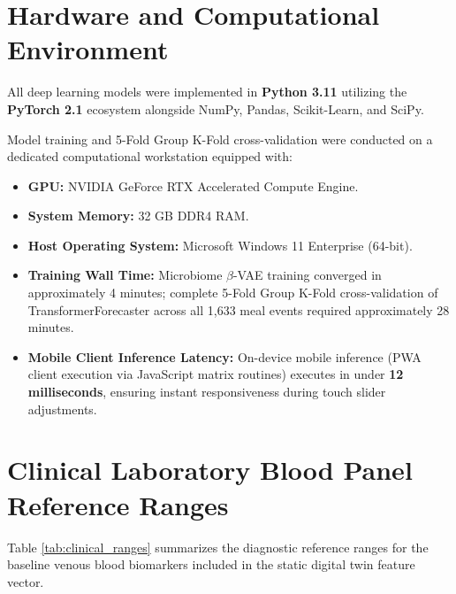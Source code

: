 \section{Hardware and Computational Environment}
All deep learning models were implemented in \textbf{Python 3.11} utilizing the \textbf{PyTorch 2.1} ecosystem alongside NumPy, Pandas, Scikit-Learn, and SciPy. 

Model training and 5-Fold Group K-Fold cross-validation were conducted on a dedicated computational workstation equipped with:
\begin{itemize}
    \item \textbf{GPU:} NVIDIA GeForce RTX Accelerated Compute Engine.
    \item \textbf{System Memory:} 32 GB DDR4 RAM.
    \item \textbf{Host Operating System:} Microsoft Windows 11 Enterprise (64-bit).
    \item \textbf{Training Wall Time:} Microbiome $\beta$-VAE training converged in approximately 4 minutes; complete 5-Fold Group K-Fold cross-validation of TransformerForecaster across all 1,633 meal events required approximately 28 minutes.
    \item \textbf{Mobile Client Inference Latency:} On-device mobile inference (PWA client execution via JavaScript matrix routines) executes in under \textbf{12 milliseconds}, ensuring instant responsiveness during touch slider adjustments.
\end{itemize}

\section{Clinical Laboratory Blood Panel Reference Ranges}
Table \ref{tab:clinical_ranges} summarizes the diagnostic reference ranges for the baseline venous blood biomarkers included in the static digital twin feature vector.

